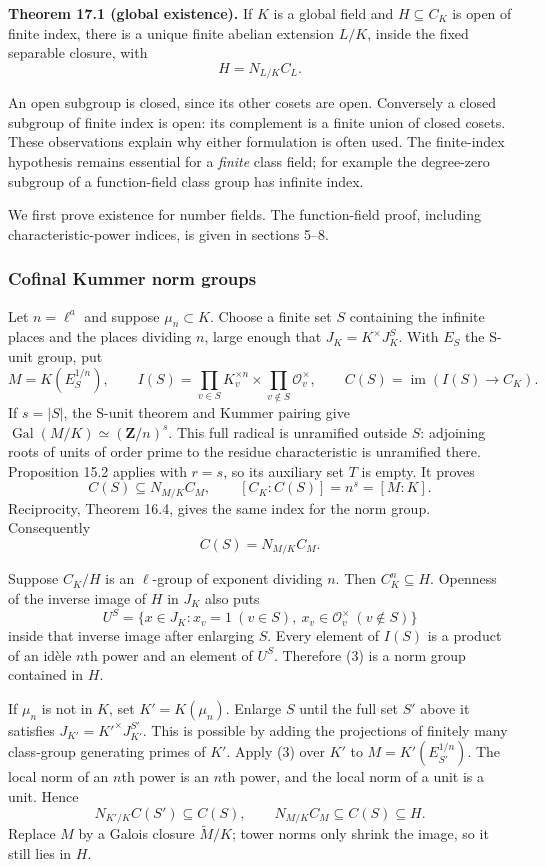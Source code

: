 \documentclass[11pt,a4paper]{article}
\begin{document}
\textbf{Theorem 17.1 (global existence).} If \(K\) is a global field and
\(H\subseteq C_K\) is open of finite index, there is a unique finite
abelian extension \(L/K\), inside the fixed separable closure, with \[
H=N_{L/K}C_L.
\tag{1}
\]

An open subgroup is closed, since its other cosets are open. Conversely
a closed subgroup of finite index is open: its complement is a finite
union of closed cosets. These observations explain why either
formulation is often used. The finite-index hypothesis remains essential
for a \emph{finite} class field; for example the degree-zero subgroup of
a function-field class group has infinite index.

We first prove existence for number fields. The function-field proof,
including characteristic-power indices, is given in sections 5--8.

\subsubsection{Cofinal Kummer norm
groups}\label{cofinal-kummer-norm-groups}

Let \(n=\ell^a\) and suppose \(\mu_n\subset K\). Choose a finite set
\(S\) containing the infinite places and the places dividing \(n\),
large enough that \(J_K=K^\times J_K^S\). With \(E_S\) the S-unit group,
put \[
M=K(E_S^{1/n}),\qquad
I(S)=\prod_{v\in S}K_v^{\times n}\times\prod_{v\notin S}\mathcal O_v^\times,
\qquad C(S)=\operatorname{im}(I(S)\to C_K).
\tag{2}
\] If \(s=|S|\), the S-unit theorem and Kummer pairing give
\(\operatorname{Gal}(M/K)\simeq(\mathbf Z/n)^s\). This full radical is
unramified outside \(S\): adjoining roots of units of order prime to the
residue characteristic is unramified there. Proposition 15.2 applies
with \(r=s\), so its auxiliary set \(T\) is empty. It proves \[
C(S)\subseteq N_{M/K}C_M,\qquad [C_K:C(S)]=n^s=[M:K].
\] Reciprocity, Theorem 16.4, gives the same index for the norm group.
Consequently \[
C(S)=N_{M/K}C_M.
\tag{3}
\]

Suppose \(C_K/H\) is an \(\ell\)-group of exponent dividing \(n\). Then
\(C_K^n\subseteq H\). Openness of the inverse image of \(H\) in \(J_K\)
also puts \[
U^S=\{x\in J_K:x_v=1\ (v\in S),\ x_v\in\mathcal O_v^\times\ (v\notin S)\}
\tag{4}
\] inside that inverse image after enlarging \(S\). Every element of
\(I(S)\) is a product of an idèle \(n\)th power and an element of
\(U^S\). Therefore (3) is a norm group contained in \(H\).

If \(\mu_n\) is not in \(K\), set \(K'=K(\mu_n)\). Enlarge \(S\) until
the full set \(S'\) above it satisfies \(J_{K'}=K'^\times J_{K'}^{S'}\).
This is possible by adding the projections of finitely many class-group
generating primes of \(K'\). Apply (3) over \(K'\) to
\(M=K'(E_{S'}^{1/n})\). The local norm of an \(n\)th power is an \(n\)th
power, and the local norm of a unit is a unit. Hence \[
N_{K'/K}C(S')\subseteq C(S),\qquad
N_{M/K}C_M\subseteq C(S)\subseteq H.
\tag{5}
\] Replace \(M\) by a Galois closure \(\widetilde M/K\); tower norms
only shrink the image, so it still lies in \(H\).
\end{document}
